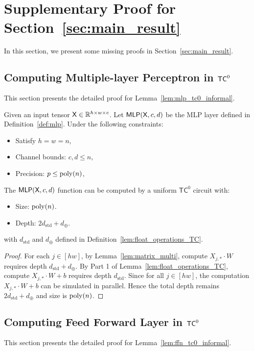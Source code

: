 \section{Supplementary Proof for Section~\ref{sec:main_result}}\label{sec:app_missing_proof}
In this section, we present some missing proofs in Section~\ref{sec:main_result}. 

\subsection{Computing Multiple-layer Perceptron in \texorpdfstring{$\mathsf{TC}^0$}{} }\label{sec:app_mlp_tc0}
This section presents the detailed proof for Lemma~\ref{lem:mlp_tc0_informal}.

\begin{lemma}\label{lem:mlp_tc0_formal}
    Given an input tensor $\mathsf{X}\in \mathbb{R}^{h \times w \times c}$. Let $\mathsf{MLP}(\mathsf{X},c,d)$ be the MLP layer defined in Definition~\ref{def:mlp}. Under the following constraints:
    \begin{itemize}
        \item Satisfy $h = w = n$,
        \item Channel bounds: $c, d\leq n$,
        \item Precision: $p \leq \operatorname{poly}(n)$,
    \end{itemize}
    The $\mathsf{MLP}(\mathsf{X},c,d)$ function can be computed by a uniform $\mathsf{TC}^0$ circuit with:
    \begin{itemize}
        \item Size: $\operatorname{poly}(n)$.
        \item Depth: $2d_\mathrm{std} + d_{\oplus}$.
    \end{itemize}
    with $d_{\mathrm{std}}$ and $d_{\oplus}$ defined in Definition~\ref{lem:float_operations_TC}.
\end{lemma}


\begin{proof}
    For each $j \in [hw]$, by Lemma~\ref{lem:matrix_multi}, 
    compute $X_{j,*} \cdot W$ requires depth $d_{\mathrm{std}} + d_{\oplus}$. By Part 1 of Lemma~\ref{lem:float_operations_TC}, compute $X_{j,*} \cdot W + b$ requires depth $d_{\mathrm{std}}$.  Since for all $j \in [hw]$, the computation $X_{j,*} \cdot W + b$ can be simulated in parallel. Hence the total depth remains $2d_\mathrm{std} + d_{\oplus}$ and size is $\operatorname{poly}(n)$.
\end{proof}
\subsection{Computing Feed Forward Layer in \texorpdfstring{$\mathsf{TC}^0$}{} }\label{sec:app_ffn_tc0}
This section presents the detailed proof for Lemma~\ref{lem:ffn_tc0_informal}.

